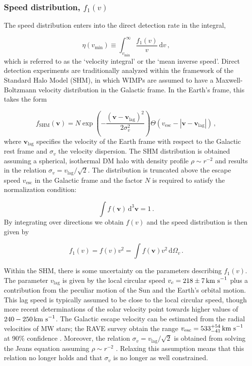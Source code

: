 \subsubsection{Speed distribution, $f_1(v)$}

The speed distribution enters into the direct detection rate in the integral,

\begin{equation}
\label{eq:DD:eta}
\eta(v_\textrm{min}) \equiv \int_{v_\textrm{min}}^\infty \frac{f_1(v)}{v} \, \mathrm{d}v\,,
\end{equation}
which is referred to as the `velocity integral' or the `mean inverse speed'. Direct detection experiments are traditionally analyzed within the framework of the Standard Halo Model (SHM), in which WIMPs are assumed to have a Maxwell-Boltzmann velocity distribution in the Galactic frame. In the Earth's frame, this takes the form

\begin{equation}
\label{eq:gaussian}
f_{\textrm{SHM}}(\textbf{v}) = N \exp\left(-\frac{(\textbf{v} - \textbf{v}_\textrm{lag})^2}{2\sigma_v^2}\right) \Theta(v_\textrm{esc} - |\textbf{v} - \textbf{v}_\textrm{lag}|)\,,
\end{equation}
where $\textbf{v}_\textrm{lag}$ specifies the velocity of the Earth frame with respect to the Galactic rest frame and $\sigma_v$ the velocity dispersion. The SHM distribution is obtained assuming a spherical, isothermal DM halo with density profile $\rho \sim r^{-2}$ and results in the relation $\sigma_v = v_\textrm{lag}/\sqrt{2}$. The distribution is truncated above the escape speed $v_\textrm{esc}$ in the Galactic frame and the factor $N$ is required to satisfy the normalization condition:

\begin{equation}
\label{eq:DD:normalization}
\int f(\textbf{v}) \, \mathrm{d}^3\textbf{v} = 1\,.
\end{equation}
By integrating over directions we obtain $f(v)$ and the speed distribution is then given by

\begin{equation}
f_1(v) = f(v) v^2 = \int f(\textbf{v}) v^2 \, \mathrm{d}\Omega_v\,.
\end{equation}

Within the SHM, there is some uncertainty on the parameters describing $f_1(v)$. The parameter $v_\textrm{lag}$ is given by the local circular speed $v_c = 218 \pm 7 \,\textrm{km s}^{-1}$ \cite{Kerr:1986,Feast:1997} plus a contribution from the peculiar motion of the Sun and the Earth's orbital motion. This lag speed is typically assumed to be close to the local circular speed, though more recent determinations of the solar velocity point towards higher values \cite{Schonrich:2012,Bovy:2012a} of $240-250 \,\textrm{km s}^{-1}$. The Galactic escape velocity can be estimated from the radial velocities of MW stars; the RAVE survey obtain the range $v_\textrm{esc} = 533_{-41}^{+54} \,\textrm{km s}^{-1}$ at 90\% confidence \cite{RAVE:2007, RAVE:2014}. Moreover, the relation $\sigma_v =  v_\textrm{lag}/\sqrt{2}$ is obtained from solving the Jeans equation assuming $\rho \sim r^{-2}$ \cite{Binney:2008}. Relaxing this assumption means that this relation no longer holds and that $\sigma_v$ is no longer as well constrained.

